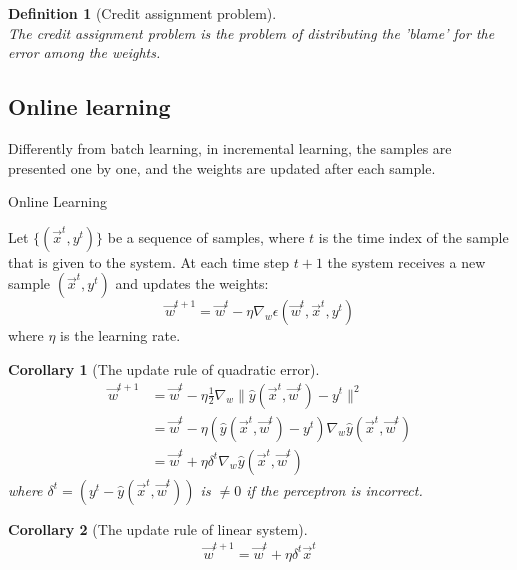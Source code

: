 \documentclass[11pt]{book} %
\newtheorem{definition}{Definition}[section]
\newtheorem{corollary}{Corollary}[section]
\begin{document}
\begin{definition}[Credit assignment problem]\ \\
    The credit assignment problem is the problem of distributing the 'blame' for the error among the weights.
\end{definition}


\subsection{Online learning}

Differently from batch learning, in incremental learning, the samples are presented one by one, and the weights are updated after each sample.

\begin{algorithm}[H]
    \SetAlgoLined
    \caption{Online Learning}
    Let $\{ (\vec{x}^t, y^t) \}$ be a sequence of samples, where $t$ is the time index of the sample that is given to the system. At each time step $t+1$ the system receives a new sample $(\vec{x}^{t}, y^{t})$ and updates the weights: 
    \[ \vec{w}^{t+1} = \vec{w}^{t} - \eta \nabla_w \epsilon(\vec{w}^{t}, \vec{x}^{t}, y^{t}) \]
    where $\eta$ is the learning rate.
\end{algorithm}


\begin{corollary}[The update rule of quadratic error]\ \\
    \begin{align*}
        \vec{w}^{t+1} &= \vec{w}^{t} - \eta \frac{1}{2} \nabla_w \lVert \hat{y}(\vec{x}^t, \vec{w}^t) - y^t \rVert^2  \\ 
        &= \vec{w}^{t} - \eta (\hat{y}(\vec{x}^t, \vec{w}^t) - y^t) \nabla_w \hat{y}(\vec{x}^t, \vec{w}^t) \\
        &= \vec{w}^{t} + \eta \delta^t \nabla_w \hat{y}(\vec{x}^t, \vec{w}^t)
    \end{align*}
    where $\delta^t = (y^t - \hat{y}(\vec{x}^t, \vec{w}^t))$ is $\neq 0$ if the perceptron is incorrect.
\end{corollary}

\begin{corollary}[The update rule of linear system]\ \\
    \begin{align}
        \vec{w}^{t+1} = \vec{w}^{t} + \eta \delta^t \vec{x}^t
    \end{align}
    

\end{corollary}
\end{document}
